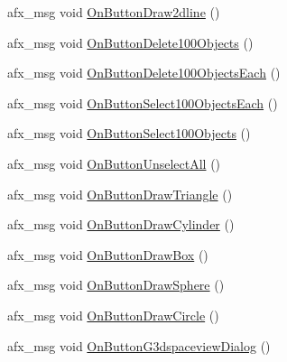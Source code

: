 \begin{DoxyCompactItemize}
afx\+\_\+msg void \hyperlink{class_c_g_engine_launcher_view_ae767ac3f5e97e090c4223cfc0da41f3d}{On\+Button\+Draw2dline} ()
\item 
afx\+\_\+msg void \hyperlink{class_c_g_engine_launcher_view_a4616b4699e6761e84874317d0616d386}{On\+Button\+Delete100\+Objects} ()
\item 
afx\+\_\+msg void \hyperlink{class_c_g_engine_launcher_view_a522fd113de1a099cfc896936723bc144}{On\+Button\+Delete100\+Objects\+Each} ()
\item 
afx\+\_\+msg void \hyperlink{class_c_g_engine_launcher_view_aa6ba3da13ab7ed61c5e6b32b1a5d0ddb}{On\+Button\+Select100\+Objects\+Each} ()
\item 
afx\+\_\+msg void \hyperlink{class_c_g_engine_launcher_view_a9c69b15ebe6fbce928f758e8f5e4a805}{On\+Button\+Select100\+Objects} ()
\item 
afx\+\_\+msg void \hyperlink{class_c_g_engine_launcher_view_a05704e544786ddfc5958525e99eee4a5}{On\+Button\+Unselect\+All} ()
\item 
afx\+\_\+msg void \hyperlink{class_c_g_engine_launcher_view_aaba0ad3f8af6c11b65a9ca15bb86241c}{On\+Button\+Draw\+Triangle} ()
\item 
afx\+\_\+msg void \hyperlink{class_c_g_engine_launcher_view_a57fc145cb422ae13302ab2196f093d9a}{On\+Button\+Draw\+Cylinder} ()
\item 
afx\+\_\+msg void \hyperlink{class_c_g_engine_launcher_view_ab0bb327d0f4a4f63023ad99d7a510dcf}{On\+Button\+Draw\+Box} ()
\item 
afx\+\_\+msg void \hyperlink{class_c_g_engine_launcher_view_af6f94014adf0b41db5b29decacc41e9c}{On\+Button\+Draw\+Sphere} ()
\item 
afx\+\_\+msg void \hyperlink{class_c_g_engine_launcher_view_a6dd23a4860588e85f2443847ca865b7f}{On\+Button\+Draw\+Circle} ()
\item 
afx\+\_\+msg void \hyperlink{class_c_g_engine_launcher_view_a432e40bf214d0469e8e8d9aa50b9e9b0}{On\+Button\+G3dspaceview\+Dialog} ()
\end{DoxyCompactItemize}
